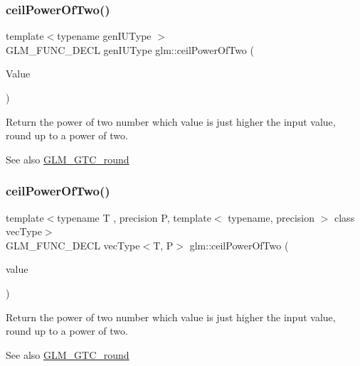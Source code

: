 \subsubsection{\texorpdfstring{ceil\+Power\+Of\+Two()}{ceilPowerOfTwo()}\hspace{0.1cm}{\footnotesize\ttfamily [1/2]}}
{\footnotesize\ttfamily template$<$typename gen\+I\+U\+Type $>$ \\
G\+L\+M\+\_\+\+F\+U\+N\+C\+\_\+\+D\+E\+CL gen\+I\+U\+Type glm\+::ceil\+Power\+Of\+Two (\begin{DoxyParamCaption}\item[{gen\+I\+U\+Type}]{Value }\end{DoxyParamCaption})}

Return the power of two number which value is just higher the input value, round up to a power of two.

\begin{DoxySeeAlso}{See also}
\hyperlink{group__gtc__round}{G\+L\+M\+\_\+\+G\+T\+C\+\_\+round} 
\end{DoxySeeAlso}
\mbox{\label{group__gtc__round_ga76ec9b214ea1376fe09a903e34bab847}} 
\subsubsection{\texorpdfstring{ceil\+Power\+Of\+Two()}{ceilPowerOfTwo()}\hspace{0.1cm}{\footnotesize\ttfamily [2/2]}}
{\footnotesize\ttfamily template$<$typename T , precision P, template$<$ typename, precision $>$ class vec\+Type$>$ \\
G\+L\+M\+\_\+\+F\+U\+N\+C\+\_\+\+D\+E\+CL vec\+Type$<$T, P$>$ glm\+::ceil\+Power\+Of\+Two (\begin{DoxyParamCaption}\item[{vec\+Type$<$ T, P $>$ const \&}]{value }\end{DoxyParamCaption})}

Return the power of two number which value is just higher the input value, round up to a power of two.

\begin{DoxySeeAlso}{See also}
\hyperlink{group__gtc__round}{G\+L\+M\+\_\+\+G\+T\+C\+\_\+round} 
\end{DoxySeeAlso}
\mbox{\label{group__gtc__round_ga9eafb9dbedf84e5cece65c2fe9d5631d}} 
